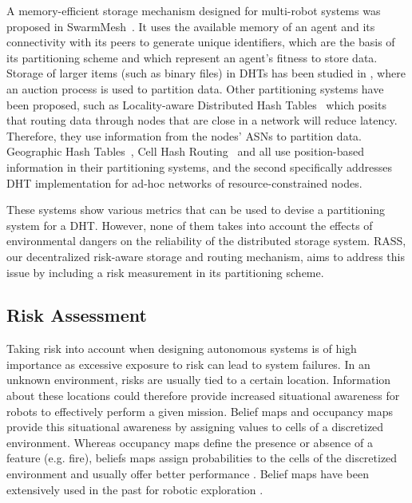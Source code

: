 A memory-efficient storage mechanism designed for multi-robot systems
was proposed in SwarmMesh~\cite{majcherczykSwarmmesh2020}. It
uses the available memory of an agent and its connectivity with its
peers to generate unique identifiers, which are the basis of its
partitioning scheme and which represent an agent's fitness to store
data. Storage of larger items (such as binary files) in \ac{DHT}s has been
studied in \cite{varadharajan2020soul}, where an auction process is
used to partition data.  Other partitioning systems have been
proposed, such as Locality-aware Distributed Hash
Tables~\cite{wu2008ldht} which posits that routing data through nodes
that are close in a network will reduce latency. Therefore, they use
information from the nodes' \ac{ASN}s to
partition data.  Geographic Hash Tables~\cite{ratnasamy2002ght}, Cell
Hash Routing~\cite{araujo2005chr} and \cite{ahullo2008supporting} all
use position-based information in their partitioning systems, and the
second specifically addresses \ac{DHT} implementation for ad-hoc networks
of resource-constrained nodes.

These systems show various metrics that can be used to devise a
partitioning system for a \ac{DHT}. However, none of them takes into
account the effects of environmental dangers on the reliability of the
distributed storage system. \ac{RASS}, our decentralized risk-aware storage and routing mechanism, aims to address this issue by including
a risk measurement in its partitioning scheme.

\subsection{Risk Assessment}

Taking risk into account when designing autonomous systems is of high
importance as excessive exposure to risk can lead to system
failures. In an unknown environment, risks are usually
tied to a certain location. Information about these locations could therefore
provide increased situational awareness for robots to effectively
perform a given mission. Belief maps and occupancy maps provide this
situational awareness by assigning values to cells of a discretized
environment. Whereas occupancy maps define the presence or absence of
a feature (e.g. fire), beliefs maps assign probabilities to the cells
of the discretized environment and usually offer better performance
\cite{stachnissMappingExplorationMobile2003}. Belief maps have been
extensively used in the past for robotic exploration
\cite{kobayashiSharingExploringInformation2002,
  kobayashiDeterminationExplorationTarget2003,
  indelmanCooperativeMultirobotBelief2018}.

